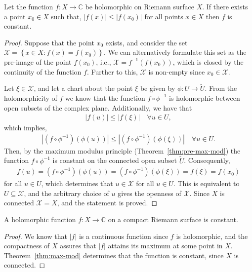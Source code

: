 \begin{theorem}\label{thm:max-mod}
	Let the function $ f:X \to \mathbb{C} $ be holomorphic on Riemann surface $ X $.
	If there exists a point $ x_0 \in X $ such that, $ |f(x)|\leq|f(x_0)| $ for all
	points $ x \in X $ then $ f $ is constant.
	\begin{proof}
		Suppose that the point $ x_0 $ exists, and consider the set $ \mathcal{X} =
			\left\{ x \in X: f(x)=f(x_0) \right\} $. We can alternatively formulate this set
		as the pre-image of the point $ f(x_0) $, i.e., $ \mathcal{X} = f ^{-1}(f(x_0))
		$, which is closed by the continuity of the function $ f $. Further to this, $
			\mathcal{X} $ is non-empty since $ x_0 \in \mathcal{X} $.

		Let $ \xi \in \mathcal{X} $, and let a chart about the point $ \xi $ be given by
		$ \phi:U \to \tilde{U} $. From the holomorphicity of $ f $ we know that the
		function $ f \circ \phi ^{-1} $ is holomorphic between open subsets of the
		complex plane. Additionally, we have that
		\begin{align*}
			|f(u)|\leq |f(\xi)| \quad \forall u \in U,
		\end{align*}
		which implies,
		\begin{align*}
			|(f \circ \phi ^{-1})(\phi(u))|\leq |(f \circ \phi ^{-1})(\phi(\xi))| \quad
			\forall u \in U.
		\end{align*}
		Then, by the maximum modulus principle (Theorem~\ref{thm:pre-max-mod}) the
		function $ f \circ \phi ^{-1} $ is constant on the connected open subset $
			\tilde{U} $. Consequently,
		\begin{align*}
			f(u) = (f \circ \phi ^{-1})(\phi(u)) = (f \circ \phi ^{-1})(\phi(\xi)) =
			f(\xi) = f(x_0)
		\end{align*}
		for all $ u \in U $, which determines that $ u \in \mathcal{X} $ for all $ u
			\in U $. This is equivalent to $ U \subseteq \mathcal{X} $, and the
		arbitrary choice of $ u $ gives the openness of $ \mathcal{X} $. Since $ X $ is
		connected $ \mathcal{X}=X $, and the statement is proved.
	\end{proof}
\end{theorem}

\begin{corollary}[Liouville]\label{cor:liouville}
	A holomorphic function $ f:X \to \mathbb{C} $ on a compact Riemann surface is
	constant.
	\begin{proof}
		We know that $ |f| $ is a continuous function since $ f $ is holomorphic, and
		the compactness of $ X $ assures that $ |f| $ attains its maximum at some point
		in $ X $. Theorem~\ref{thm:max-mod} determines that the function is constant,
		since $ X $ is connected.
	\end{proof}
\end{corollary}

